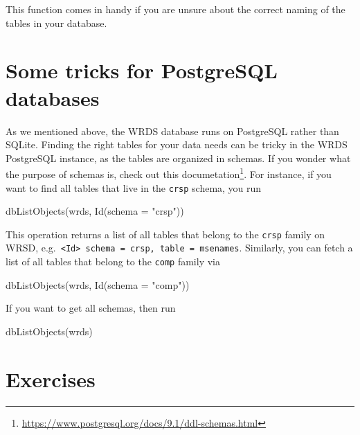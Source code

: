 \documentclass[
]{book}
\newenvironment{Shaded}{\begin{snugshade}}{\end{snugshade}}
\newcommand{\AttributeTok}[1]{\textcolor[rgb]{0.61,0.61,0.61}{#1}}
\newcommand{\FunctionTok}[1]{\textcolor[rgb]{0,0,0}{#1}}
\newcommand{\NormalTok}[1]{#1}
\newcommand{\StringTok}[1]{\textcolor[rgb]{0.5,0.5,0.5}{#1}}
\renewcommand{\href}[2]{#2\footnote{\url{#1}}}
\begin{document}
This function comes in handy if you are unsure about the correct naming of the tables in your database.

\hypertarget{some-tricks-for-postgresql-databases}{%
\section{Some tricks for PostgreSQL databases}\label{some-tricks-for-postgresql-databases}}

As we mentioned above, the WRDS database runs on PostgreSQL rather than SQLite. Finding the right tables for your data needs can be tricky in the WRDS PostgreSQL instance, as the tables are organized in schemas. If you wonder what the purpose of schemas is, check out \href{https://www.postgresql.org/docs/9.1/ddl-schemas.html}{this documetation}. For instance, if you want to find all tables that live in the \texttt{crsp} schema, you run

\begin{Shaded}
\begin{Highlighting}[]
\FunctionTok{dbListObjects}\NormalTok{(wrds, }\FunctionTok{Id}\NormalTok{(}\AttributeTok{schema =} \StringTok{"crsp"}\NormalTok{))}
\end{Highlighting}
\end{Shaded}

This operation returns a list of all tables that belong to the \texttt{crsp} family on WRSD, e.g.~\texttt{\textless{}Id\textgreater{}\ schema\ =\ crsp,\ table\ =\ msenames}. Similarly, you can fetch a list of all tables that belong to the \texttt{comp} family via

\begin{Shaded}
\begin{Highlighting}[]
\FunctionTok{dbListObjects}\NormalTok{(wrds, }\FunctionTok{Id}\NormalTok{(}\AttributeTok{schema =} \StringTok{"comp"}\NormalTok{))}
\end{Highlighting}
\end{Shaded}

If you want to get all schemas, then run

\begin{Shaded}
\begin{Highlighting}[]
\FunctionTok{dbListObjects}\NormalTok{(wrds)}
\end{Highlighting}
\end{Shaded}

\hypertarget{exercises-1}{%
\section{Exercises}\label{exercises-1}}
\end{document}
